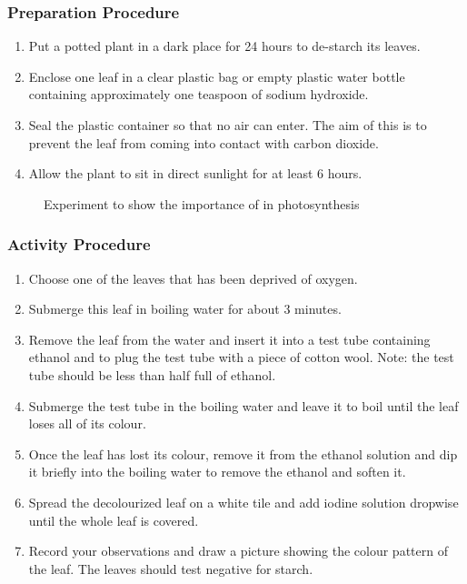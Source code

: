 \subsubsection*{Preparation Procedure}
\begin{enumerate}
\item{Put a potted plant in a dark place for 24 hours to de-starch its leaves.}
\item{Enclose one leaf in a clear plastic bag or empty plastic water bottle containing approximately one teaspoon of sodium hydroxide.}
\item{Seal the plastic container so that no air can enter. The aim of this is to prevent the leaf from coming into contact with carbon dioxide.}
\item{Allow the plant to sit in direct sunlight for at least 6 hours.}
\end{enumerate}

\begin{figure}[h]
\begin{center}
\def\svgwidth{3cm}

\caption{Experiment to show the importance of  in photosynthesis}
\label{fig:CO2-photosynth}
\end{center}
\end{figure}
\subsubsection*{Activity Procedure}

\begin{enumerate}
\item{Choose one of the leaves that has been deprived of oxygen.}
\item{Submerge this leaf in boiling water for about 3 minutes.}
\item{Remove the leaf from the water and insert it into a test tube containing ethanol and to plug the test tube with a piece of cotton wool. Note: the test tube should be less than half full of ethanol.}
\item{Submerge the test tube in the boiling water and leave it to boil until the leaf loses all of its colour.}
\item{Once the leaf has lost its colour, remove it from the ethanol solution and dip it briefly into the boiling water to remove the ethanol and soften it.}
\item{Spread the decolourized leaf on a white tile and add iodine solution dropwise until the whole leaf is covered. }
\item{Record your observations and draw a picture showing the colour pattern of the leaf. The leaves should test negative for starch.}
\end{enumerate}

